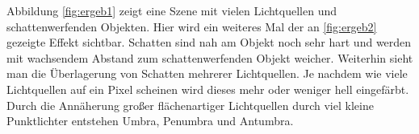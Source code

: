 Abbildung \ref{fig:ergeb1} zeigt eine Szene mit vielen Lichtquellen und schattenwerfenden Objekten.
Hier wird ein weiteres Mal der an \ref{fig:ergeb2} gezeigte Effekt sichtbar. Schatten
sind nah am Objekt noch sehr hart und werden mit wachsendem Abstand zum schattenwerfenden Objekt
weicher. Weiterhin sieht man die Überlagerung von Schatten mehrerer Lichtquellen. Je nachdem wie
viele Lichtquellen auf ein Pixel scheinen wird dieses mehr oder weniger hell eingefärbt. Durch die
Annäherung großer flächenartiger Lichtquellen durch viel kleine Punktlichter entstehen Umbra,
Penumbra und Antumbra.
